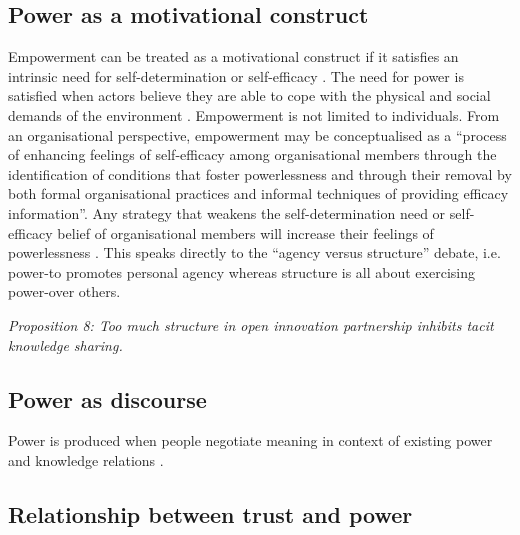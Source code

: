 \subsection{Power as a motivational construct}

Empowerment can be treated as a motivational construct if it satisfies an intrinsic need for self-determination or self-efficacy \citep{deci1989self,bandura1986social}. The need for power is satisfied when actors believe they are able to cope with the physical and social demands of the environment \citep{conger1988empowerment}. Empowerment is not limited to individuals. From an organisational perspective, empowerment may be conceptualised as a \enquote{process of enhancing feelings of self-efficacy among organisational members through the identification of conditions that foster powerlessness and through their removal by both formal organisational practices and informal techniques of providing efficacy information}. Any strategy that weakens the self-determination need or self-efficacy belief of organisational members will increase their feelings of powerlessness \citep{conger1988empowerment}. This speaks directly to the \enquote{agency versus structure} debate, i.e. power-to promotes personal agency whereas structure is all about exercising power-over others.  \medskip

\begin{tcolorbox}
\emph{Proposition 8: Too much structure in open innovation partnership inhibits tacit knowledge sharing.}
\end{tcolorbox}

\subsection{Power as discourse}

Power is produced when people negotiate meaning in context of existing power and knowledge relations \citep{foucault1980power,rouse2005power,heizmann2015power}. 


\subsection{Relationship between trust and power}

